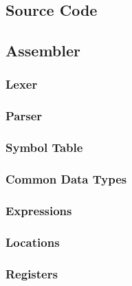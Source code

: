 \documentclass[a4paper,11pt]{report}
\begin{document}
\nocite{*}


\begin{appendices}
\noappendicestocpagenum
\addappheadtotoc 
\chapter{Source Code}
\section{Assembler}\label{source:assembler}
\subsection{Lexer}\label{source:lexer}

\subsection{Parser}\label{source:parser}

\subsection{Symbol Table}\label{source:SymbolTable}

\subsection{Common Data Types}\label{source:DataTypes}

\subsection{Expressions}\label{source:Expressions}

\subsection{Locations}\label{source:locations}

\subsection{Registers}\label{source:registers}


\end{appendices}
\end{document}
